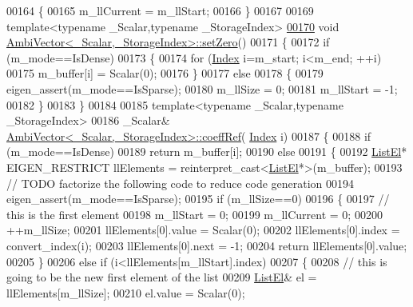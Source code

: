 \begin{DoxyCode}
00164 \{
00165   m\_llCurrent = m\_llStart;
00166 \}
00167 
00169 \textcolor{keyword}{template}<\textcolor{keyword}{typename} \_Scalar,\textcolor{keyword}{typename} \_StorageIndex>
\hyperlink{class_eigen_1_1internal_1_1_ambi_vector_af472b476758307bcc1621d9eb4018f6a}{00170} \textcolor{keywordtype}{void} \hyperlink{class_eigen_1_1internal_1_1_ambi_vector_af472b476758307bcc1621d9eb4018f6a}{AmbiVector<\_Scalar,\_StorageIndex>::setZero}()
00171 \{
00172   \textcolor{keywordflow}{if} (m\_mode==IsDense)
00173   \{
00174     \textcolor{keywordflow}{for} (\hyperlink{namespace_eigen_a62e77e0933482dafde8fe197d9a2cfde}{Index} i=m\_start; i<m\_end; ++i)
00175       m\_buffer[i] = Scalar(0);
00176   \}
00177   \textcolor{keywordflow}{else}
00178   \{
00179     eigen\_assert(m\_mode==IsSparse);
00180     m\_llSize = 0;
00181     m\_llStart = -1;
00182   \}
00183 \}
00184 
00185 \textcolor{keyword}{template}<\textcolor{keyword}{typename} \_Scalar,\textcolor{keyword}{typename} \_StorageIndex>
00186 \_Scalar& \hyperlink{class_eigen_1_1internal_1_1_ambi_vector}{AmbiVector<\_Scalar,\_StorageIndex>::coeffRef}(
      \hyperlink{namespace_eigen_a62e77e0933482dafde8fe197d9a2cfde}{Index} i)
00187 \{
00188   \textcolor{keywordflow}{if} (m\_mode==IsDense)
00189     \textcolor{keywordflow}{return} m\_buffer[i];
00190   \textcolor{keywordflow}{else}
00191   \{
00192     \hyperlink{struct_eigen_1_1internal_1_1_ambi_vector_1_1_list_el}{ListEl}* EIGEN\_RESTRICT llElements = \textcolor{keyword}{reinterpret\_cast<}\hyperlink{struct_eigen_1_1internal_1_1_ambi_vector_1_1_list_el}{ListEl}*\textcolor{keyword}{>}(m\_buffer);
00193     \textcolor{comment}{// TODO factorize the following code to reduce code generation}
00194     eigen\_assert(m\_mode==IsSparse);
00195     \textcolor{keywordflow}{if} (m\_llSize==0)
00196     \{
00197       \textcolor{comment}{// this is the first element}
00198       m\_llStart = 0;
00199       m\_llCurrent = 0;
00200       ++m\_llSize;
00201       llElements[0].value = Scalar(0);
00202       llElements[0].index = convert\_index(i);
00203       llElements[0].next = -1;
00204       \textcolor{keywordflow}{return} llElements[0].value;
00205     \}
00206     \textcolor{keywordflow}{else} \textcolor{keywordflow}{if} (i<llElements[m\_llStart].index)
00207     \{
00208       \textcolor{comment}{// this is going to be the new first element of the list}
00209       \hyperlink{struct_eigen_1_1internal_1_1_ambi_vector_1_1_list_el}{ListEl}& el = llElements[m\_llSize];
00210       el.value = Scalar(0);

\end{DoxyCode}
